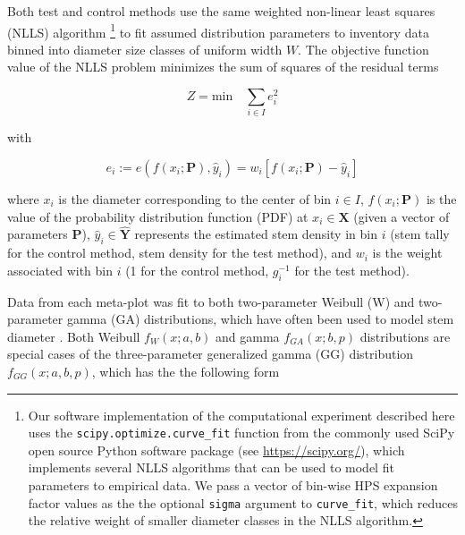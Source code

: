 \documentclass{foresj}
\begin{document}

Both test and control methods use the same weighted non-linear least
squares (NLLS) algorithm
 \footnote{Our software implementation of the
   computational experiment described here uses the \texttt{scipy.optimize.curve\_fit}
   function from the commonly used SciPy open source Python software
   package (see \url{https://scipy.org/}), which implements several NLLS
   algorithms that can be used to model fit parameters to empirical
   data. We pass a vector of bin-wise HPS expansion factor values as
   the the optional \texttt{sigma} argument to
   \texttt{curve\_fit}, which reduces the relative weight of smaller
   diameter classes in the NLLS algorithm.}
to fit assumed distribution parameters to inventory data binned into
diameter size classes of uniform width $W$.
The objective function value of the NLLS problem minimizes the sum of
squares of the residual terms

\begin{equation}
Z = \text{min} \quad \sum_{i \in I} e_i^2
\end{equation}

    with

   \begin{equation}
    e_i := e\left(f(x_i; \bm{P}), \hat{y}_i\right) = w_i \left[f(x_i; \bm{P}) - \hat{y}_i\right] 
  \end{equation}
  
  where $x_i$ is the diameter corresponding to the center of bin $i
  \in I$, $f(x_i; \bm{P})$ is the value of the probability
  distribution function (PDF) at $x_i \in \bm{X}$ (given a vector of
  parameters $\bm{P}$), $\hat{y}_i \in \bm{\hat{Y}}$ represents the
  estimated stem density in bin $i$ (stem tally for the control method, stem density for the test method), and $w_i$ is the weight associated with bin $i$ (1 for the control method, $g_i^{-1}$ for the test method).

Data from each meta-plot was fit to both two-parameter Weibull (W) and
two-parameter gamma (GA) distributions, which have often been used to model stem diameter \citep{bailey1973quantifying, cao2004predicting, ducey2015sizebiased, zutter1986characterizing, hafley1977statistical}.
Both Weibull $f_W(x; a, b)$ and gamma $f_{GA}(x; b, p)$ distributions are
special cases of the three-parameter generalized gamma (GG)
distribution  $f_{GG}(x; a, b, p)$, which has the the following form
\end{document}
